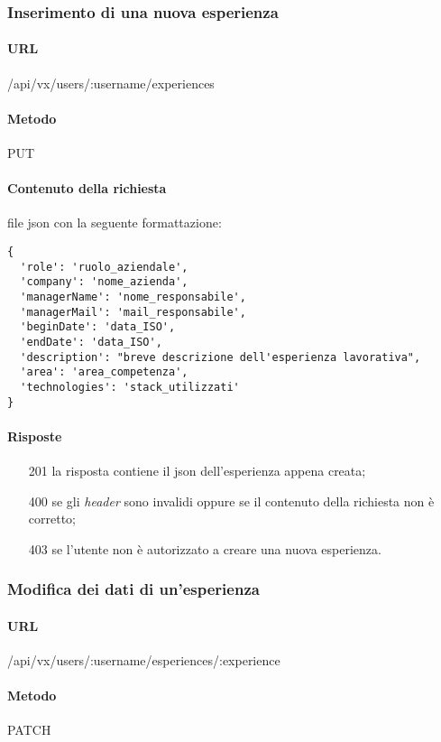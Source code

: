 \subsubsection{Inserimento di una nuova esperienza}
\paragraph{URL}
/api/vx/users/:username/experiences
\paragraph{Metodo}
PUT
\paragraph{Contenuto della richiesta}
file \gls{json} con la seguente formattazione:
\begin{verbatim}
{
  'role': 'ruolo_aziendale',
  'company': 'nome_azienda',
  'managerName': 'nome_responsabile',
  'managerMail': 'mail_responsabile',
  'beginDate': 'data_ISO',
  'endDate': 'data_ISO',
  'description': "breve descrizione dell'esperienza lavorativa",
  'area': 'area_competenza',
  'technologies': 'stack_utilizzati'
}
\end{verbatim}
\paragraph{Risposte}
\begin{itemize}
	\item[201] la risposta contiene il \gls{json} dell'esperienza appena creata;
	\item[400] se gli \emph{header} sono invalidi oppure se il contenuto della richiesta non è corretto;
	\item[403] se l'utente non è autorizzato a creare una nuova esperienza.
\end{itemize}

\subsubsection{Modifica dei dati di un'esperienza}
\paragraph{URL}
/api/vx/users/:username/esperiences/:experience
\paragraph{Metodo}
PATCH
